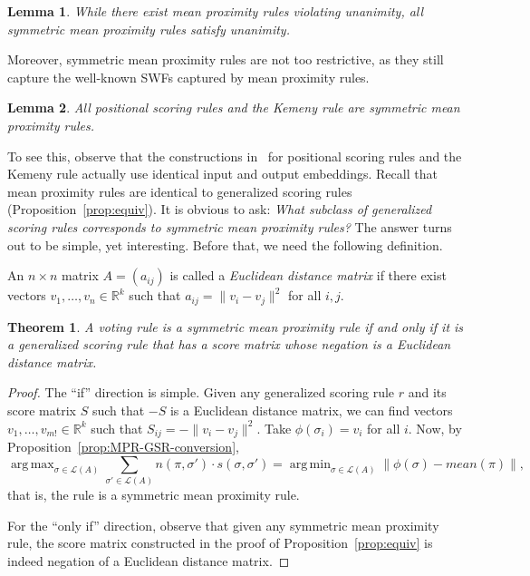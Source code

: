 \documentclass[10pt,letterpaper]{article}
\newcommand{\calL}{{\mathcal{L}}}
\newcommand{\rank}{{\calL(A)}}
\DeclareMathOperator*{\argmax}{arg\,max}
\DeclareMathOperator*{\argmin}{arg\,min}
\newtheorem{theorem}{Theorem}
\newtheorem{lemma}{Lemma}
\newenvironment{definition}[1][Definition]{\begin{trivlist}
\item[\hskip \labelsep {\bfseries #1}]}{\end{trivlist}}
\begin{document}
\begin{lemma}
While there exist mean proximity rules violating unanimity, all symmetric mean proximity rules satisfy unanimity.
\end{lemma}

Moreover, symmetric mean proximity rules are not too restrictive, as they still capture the well-known SWFs captured by mean proximity rules.

\begin{lemma}
All positional scoring rules and the Kemeny rule are symmetric mean proximity rules.
\label{lem:symmetric-captures}
\end{lemma}

To see this, observe that the constructions in~\cite{Zwicker08a} for positional scoring rules and the Kemeny rule actually use identical input and output embeddings. Recall that mean proximity rules are identical to generalized scoring rules (Proposition~\ref{prop:equiv}). It is obvious to ask: \emph{What subclass of generalized scoring rules corresponds to symmetric mean proximity rules?} The answer turns out to be simple, yet interesting. Before that, we need the following definition.


\begin{definition}[Euclidean Distance Matrix]
An $n \times n$ matrix $A = (a_{ij})$ is called a \emph{Euclidean distance matrix} if there exist vectors $v_1,\ldots,v_n \in \mathbb{R}^k$ such that $a_{ij} = \|v_i-v_j\|^2$ for all $i,j$. 
\end{definition}

\begin{theorem}
A voting rule is a symmetric mean proximity rule if and only if it is a generalized scoring rule that has a score matrix whose negation is a Euclidean distance matrix. 
\label{thm:symm}
\end{theorem}
\begin{proof}
The ``if'' direction is simple. Given any generalized scoring rule $r$ and its score matrix $S$ such that $-S$ is a Euclidean distance matrix, we can find vectors $v_1,\ldots,v_{m!} \in \mathbb{R}^k$ such that $S_{ij} = -\|v_i-v_j\|^2$. Take $\phi(\sigma_i) = v_i$ for all $i$. Now, by Proposition~\ref{prop:MPR-GSR-conversion}, 
$$
\argmax_{\sigma \in \rank} \sum_{\sigma' \in \rank} n(\pi,\sigma') \cdot s(\sigma,\sigma') = \argmin_{\sigma \in \rank} \|\phi(\sigma)-mean(\pi)\|,
$$
that is, the rule is a symmetric mean proximity rule. 

For the ``only if'' direction, observe that given any symmetric mean proximity rule, the score matrix constructed in the proof of Proposition~\ref{prop:equiv} is indeed negation of a Euclidean distance matrix.
\end{proof}
\end{document}
